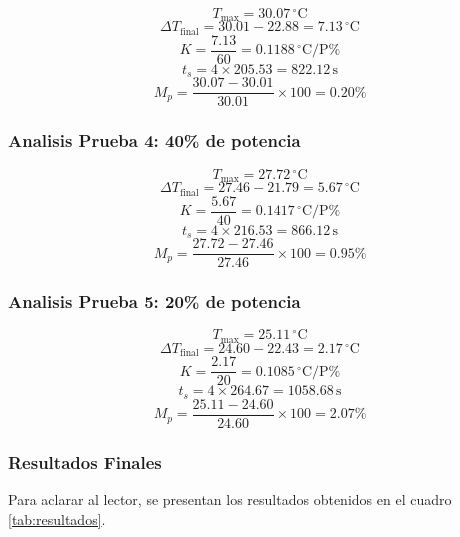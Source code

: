 \documentclass[spanish, a4paper, 11pt]{article}
\begin{document}
\[
T_{\text{max}} = 30.07 \,^\circ\mathrm{C}
\]
\[
\Delta T_{\text{final}} = 30.01 - 22.88 = 7.13 \,^\circ\mathrm{C}
\]
\[
K = \frac{7.13}{60} = 0.1188 \,^\circ\mathrm{C/P\%}
\]
\[
t_s = 4 \times 205.53 = 822.12 \, \text{s}
\]
\[
M_p = \frac{30.07 - 30.01}{30.01} \times 100 = 0.20\%
\]

\subsubsection{Analisis Prueba 4: 40\% de potencia}

\[
T_{\text{max}} = 27.72 \,^\circ\mathrm{C}
\]
\[
\Delta T_{\text{final}} = 27.46 - 21.79 = 5.67 \,^\circ\mathrm{C}
\]
\[
K = \frac{5.67}{40} = 0.1417 \,^\circ\mathrm{C/P\%}
\]
\[
t_s = 4 \times 216.53 = 866.12 \, \text{s}
\]
\[
M_p = \frac{27.72 - 27.46}{27.46} \times 100 = 0.95\%
\]

\subsubsection{Analisis Prueba 5: 20\% de potencia}

\[
T_{\text{max}} = 25.11 \,^\circ\mathrm{C}
\]
\[
\Delta T_{\text{final}} = 24.60 - 22.43 = 2.17 \,^\circ\mathrm{C}
\]
\[
K = \frac{2.17}{20} = 0.1085 \,^\circ\mathrm{C/P\%}
\]
\[
t_s = 4 \times 264.67 = 1058.68 \, \text{s}
\]
\[
M_p = \frac{25.11 - 24.60}{24.60} \times 100 = 2.07\%
\]

\subsubsection{Resultados Finales}
Para aclarar al lector, se presentan los resultados obtenidos en el cuadro \ref{tab:resultados}.

\begin{table}[ht]
    \caption{Resultados de los ensayos sin ventilador.\label{tab:resultados}}
\end{table}
\FloatBarrier
\end{document}
